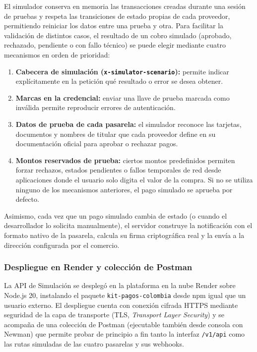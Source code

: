 El simulador conserva en memoria las transacciones creadas durante una sesión de pruebas y respeta las transiciones de estado propias de cada proveedor, permitiendo reiniciar los datos entre una prueba y otra. Para facilitar la validación de distintos casos, el resultado de un cobro simulado (aprobado, rechazado, pendiente o con fallo técnico) se puede elegir mediante cuatro mecanismos en orden de prioridad:
\begin{enumerate}
    \item \textbf{Cabecera de simulación (\texttt{x-simulator-scenario}):} permite indicar explícitamente en la petición qué resultado o error se desea obtener.
    \item \textbf{Marcas en la credencial:} enviar una llave de prueba marcada como inválida permite reproducir errores de autenticación.
    \item \textbf{Datos de prueba de cada pasarela:} el simulador reconoce las tarjetas, documentos y nombres de titular que cada proveedor define en su documentación oficial para aprobar o rechazar pagos.
    \item \textbf{Montos reservados de prueba:} ciertos montos predefinidos permiten forzar rechazos, estados pendientes o fallos temporales de red desde aplicaciones donde el usuario solo digita el valor de la compra. Si no se utiliza ninguno de los mecanismos anteriores, el pago simulado se aprueba por defecto.
\end{enumerate}

Asimismo, cada vez que un pago simulado cambia de estado (o cuando el desarrollador lo solicita manualmente), el servidor construye la notificación con el formato nativo de la pasarela, calcula su firma criptográfica real y la envía a la dirección configurada por el comercio.

\subsubsection{Despliegue en Render y colección de Postman}

La API de Simulación se desplegó en la plataforma en la nube Render sobre Node.js 20, instalando el paquete \texttt{kit-pagos-colombia} desde npm igual que un usuario externo. El despliegue cuenta con conexión cifrada HTTPS mediante seguridad de la capa de transporte (TLS, \textit{Transport Layer Security}) y se acompaña de una colección de Postman (ejecutable también desde consola con Newman) que permite probar de principio a fin tanto la interfaz \texttt{/v1/api} como las rutas simuladas de las cuatro pasarelas y sus webhooks.

